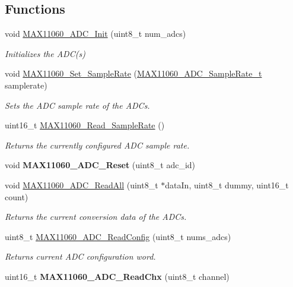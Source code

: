\subsection*{Functions}
\begin{DoxyCompactItemize}
\item 
void \hyperlink{group__max11060_gaa192a4cf5e3a197e0eb9471c19b2a941}{M\+A\+X11060\+\_\+\+A\+D\+C\+\_\+\+Init} (uint8\+\_\+t num\+\_\+adcs)
\begin{DoxyCompactList}\small\item\em Initializes the A\+D\+C(s) \end{DoxyCompactList}\item 
void \hyperlink{group__max11060_ga909641b70627de2ed44345926a48f7af}{M\+A\+X11060\+\_\+\+Set\+\_\+\+Sample\+Rate} (\hyperlink{group__max11060_ga2a33837c760006578f634282dafeeee8}{M\+A\+X11060\+\_\+\+A\+D\+C\+\_\+\+Sample\+Rate\+\_\+t} samplerate)
\begin{DoxyCompactList}\small\item\em Sets the A\+D\+C sample rate of the A\+D\+Cs. \end{DoxyCompactList}\item 
uint16\+\_\+t \hyperlink{group__max11060_ga91bf379e0ad34c502ccb60ee71a7dc4d}{M\+A\+X11060\+\_\+\+Read\+\_\+\+Sample\+Rate} ()
\begin{DoxyCompactList}\small\item\em Returns the currently configured A\+D\+C sample rate. \end{DoxyCompactList}\item 
\hypertarget{group__max11060_ga5f2f36f5720692abb987eb211265c096}{}void {\bfseries M\+A\+X11060\+\_\+\+A\+D\+C\+\_\+\+Reset} (uint8\+\_\+t adc\+\_\+id)\label{group__max11060_ga5f2f36f5720692abb987eb211265c096}

\item 
void \hyperlink{group__max11060_gaa01d268c5312e6221cda1434cc8ebb86}{M\+A\+X11060\+\_\+\+A\+D\+C\+\_\+\+Read\+All} (uint8\+\_\+t $\ast$data\+In, uint8\+\_\+t dummy, uint16\+\_\+t count)
\begin{DoxyCompactList}\small\item\em Returns the current conversion data of the A\+D\+Cs. \end{DoxyCompactList}\item 
uint8\+\_\+t \hyperlink{group__max11060_gaea0b3edcc35f98e07218d2c41bc67b0c}{M\+A\+X11060\+\_\+\+A\+D\+C\+\_\+\+Read\+Config} (uint8\+\_\+t nums\+\_\+adcs)
\begin{DoxyCompactList}\small\item\em Returns current A\+D\+C configuration word. \end{DoxyCompactList}\item 
\hypertarget{group__max11060_gaa892669ed2e1cd88828155724d5a71f3}{}uint16\+\_\+t {\bfseries M\+A\+X11060\+\_\+\+A\+D\+C\+\_\+\+Read\+Chx} (uint8\+\_\+t channel)\label{group__max11060_gaa892669ed2e1cd88828155724d5a71f3}

\end{DoxyCompactItemize}


